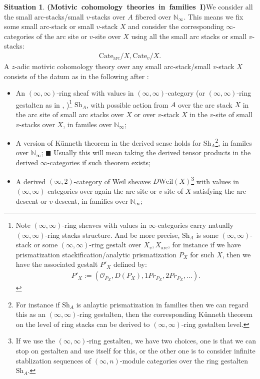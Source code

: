 \documentclass[12pt]{article}
\theoremstyle{definition}
\newtheorem{situation}{Situation}
\begin{document}
\begin{situation}\mbox{\textbf{(Motivic cohomology theories in families I)}}\label{situation1}
We consider all the small arc-stacks/small $v$-stacks over $A$ fibered over $\mathbb{N}_\infty$. This means we fix some small arc-stack or small $v$-stack $X$ and consider the corresponding $\infty$-categories of the arc site or $v$-site over $X$ using all the small arc stacks or small $v$-stacks:
\begin{align}
\mathrm{Cate}_\mathrm{arc}/X,\mathrm{Cate}_v/X.
\end{align}
A $z$-adic motivic cohomology theory over any small arc-stack/small $v$-stack $X$ consists of the datum as in the following after \cite{3A}:
\begin{itemize}\setlength{\itemsep}{-0.1cm}
\item[A1] An $(\infty,\infty)$-ring sheaf with values in $(\infty,\infty)$-category (or $(\infty,\infty)$-ring gestalten as in \cite{5S4}, \cite{5S5})\footnote{Note $(\infty,\infty)$-ring sheaves with values in $\infty$-categories carry natually $(\infty,\infty)$-ring stacks structure. And be more precise, $\mathrm{Sh}_A$ is some $(\infty,\infty)$-stack or some $(\infty,\infty)$-ring gestalt over $X_v,X_\mathrm{arc}$, for instance if we have prismatization stackification/analytic prismatization $P_X$ for such $X$, then we have the associated gestalt $P'_X$ defined by:
\begin{align}
P'_{X}:= (\mathcal{O}_{P_X}, D(P_X), 1Pr_{P_X}, 2Pr_{P_X},...).
\end{align}} $\mathrm{Sh}_A$, with possible action from $A$ over the arc stack $X$ in the arc site of small arc stacks over $X$ or over $v$-stack $X$ in the $v$-site of small $v$-stacks over $X$, in familes over $\mathbb{N}_\infty$;
\item[A2] A version of K\"unneth theorem in the derived sense holds for $\mathrm{Sh}_A$\footnote{For instance if $\mathrm{Sh}_A$ is anlaytic prismatization in families then we can regard this as an $(\infty,\infty)$-ring gestalten, then the corresponding K\"unneth theorem on the level of ring stacks can be derived to $(\infty,\infty)$-ring gestalten level.}, in familes over $\mathbb{N}_\infty$;
\subitem $\blacksquare$ Usually this will mean taking the derived tensor products in the derived $\infty$-categories if such theorem exists; 
\item[A3] A derived $(\infty,2)$-category of Weil sheaves $D\mathrm{Weil}(X)$\footnote{If we use the $(\infty,\infty)$-ring gestalten, we have two choices, one is that we can stop on gestalten and use itself for this, or the other one is to consider infinite stablization sequences of $(\infty,n)$-module categories over the ring gestalten $\mathrm{Sh}_A$.} with values in $(\infty,\infty)$-categories over again the arc site or $v$-site of $X$ satisfying the arc-descent or $v$-descent, in families over $\mathbb{N}_\infty$;

\end{itemize}
\end{situation}
\end{document}
